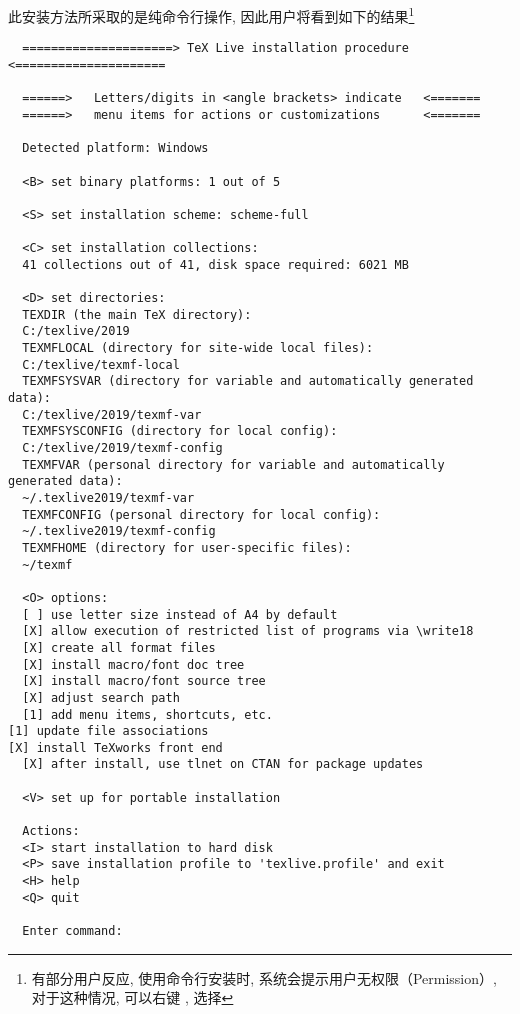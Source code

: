 \documentclass{ctexrep}
\begin{document}
此安装方法所采取的是纯命令行操作, 因此用户将看到如下的结果\footnote{有部分用户反应, 使用命令行安装时, 系统会提示用户无权限（Permission）, 对于这种情况, 可以右键 , 选择 }
\begin{lstlisting}
  =====================> TeX Live installation procedure <=====================
  
  ======>   Letters/digits in <angle brackets> indicate   <=======
  ======>   menu items for actions or customizations      <=======
  
  Detected platform: Windows
  
  <B> set binary platforms: 1 out of 5
  
  <S> set installation scheme: scheme-full
  
  <C> set installation collections:
  41 collections out of 41, disk space required: 6021 MB
  
  <D> set directories:
  TEXDIR (the main TeX directory):
  C:/texlive/2019
  TEXMFLOCAL (directory for site-wide local files):
  C:/texlive/texmf-local
  TEXMFSYSVAR (directory for variable and automatically generated data):
  C:/texlive/2019/texmf-var
  TEXMFSYSCONFIG (directory for local config):
  C:/texlive/2019/texmf-config
  TEXMFVAR (personal directory for variable and automatically generated data):
  ~/.texlive2019/texmf-var
  TEXMFCONFIG (personal directory for local config):
  ~/.texlive2019/texmf-config
  TEXMFHOME (directory for user-specific files):
  ~/texmf
  
  <O> options:
  [ ] use letter size instead of A4 by default
  [X] allow execution of restricted list of programs via \write18
  [X] create all format files
  [X] install macro/font doc tree
  [X] install macro/font source tree
  [X] adjust search path
  [1] add menu items, shortcuts, etc.                                                                                                                                                                                                          [1] update file associations                                                                                                                                                                                                                 [X] install TeXworks front end
  [X] after install, use tlnet on CTAN for package updates
  
  <V> set up for portable installation
  
  Actions:
  <I> start installation to hard disk
  <P> save installation profile to 'texlive.profile' and exit
  <H> help
  <Q> quit
  
  Enter command:
\end{lstlisting}
\end{document}
